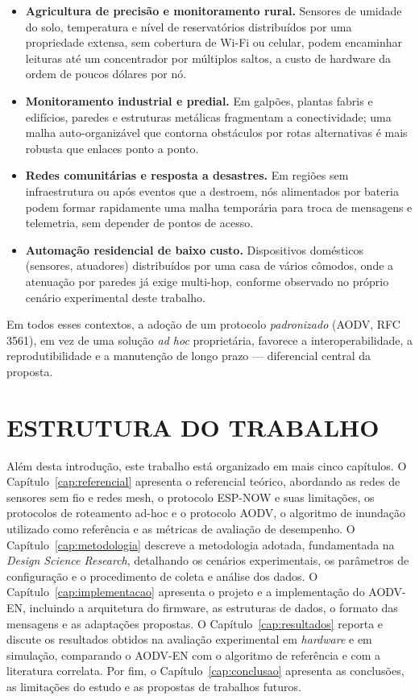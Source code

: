 \begin{itemize}
\item \textbf{Agricultura de precisão e monitoramento rural.} Sensores de
  umidade do solo, temperatura e nível de reservatórios distribuídos por
  uma propriedade extensa, sem cobertura de Wi-Fi ou celular, podem
  encaminhar leituras até um concentrador por múltiplos saltos, a custo de
  hardware da ordem de poucos dólares por nó.
\item \textbf{Monitoramento industrial e predial.} Em galpões, plantas
  fabris e edifícios, paredes e estruturas metálicas fragmentam a
  conectividade; uma malha auto-organizável que contorna obstáculos por
  rotas alternativas é mais robusta que enlaces ponto a ponto.
\item \textbf{Redes comunitárias e resposta a desastres.} Em regiões sem
  infraestrutura ou após eventos que a destroem, nós alimentados por
  bateria podem formar rapidamente uma malha temporária para troca de
  mensagens e telemetria, sem depender de pontos de acesso.
\item \textbf{Automação residencial de baixo custo.} Dispositivos
  domésticos (sensores, atuadores) distribuídos por uma casa de vários
  cômodos, onde a atenuação por paredes já exige multi-hop, conforme
  observado no próprio cenário experimental deste trabalho.
\end{itemize}

Em todos esses contextos, a adoção de um protocolo \emph{padronizado}
(AODV, RFC 3561), em vez de uma solução \emph{ad hoc} proprietária,
favorece a interoperabilidade, a reprodutibilidade e a manutenção de longo
prazo --- diferencial central da proposta.

\section{ESTRUTURA DO TRABALHO}\label{estrutura-do-trabalho}

Além desta introdução, este trabalho está organizado em mais cinco
capítulos. O Capítulo~\ref{cap:referencial} apresenta o referencial
teórico, abordando as redes de sensores sem fio e redes mesh, o
protocolo ESP-NOW e suas limitações, os protocolos de roteamento ad-hoc
e o protocolo AODV, o algoritmo de inundação utilizado como referência e
as métricas de avaliação de desempenho. O Capítulo~\ref{cap:metodologia}
descreve a metodologia adotada, fundamentada na \emph{Design Science
Research}, detalhando os cenários experimentais, os parâmetros de
configuração e o procedimento de coleta e análise dos dados. O
Capítulo~\ref{cap:implementacao} apresenta o projeto e a implementação
do AODV-EN, incluindo a arquitetura do firmware, as estruturas de dados,
o formato das mensagens e as adaptações propostas. O
Capítulo~\ref{cap:resultados} reporta e discute os resultados obtidos na
avaliação experimental em \emph{hardware} e em simulação, comparando o
AODV-EN com o algoritmo de referência e com a literatura correlata. Por
fim, o Capítulo~\ref{cap:conclusao} apresenta as conclusões, as
limitações do estudo e as propostas de trabalhos futuros.
